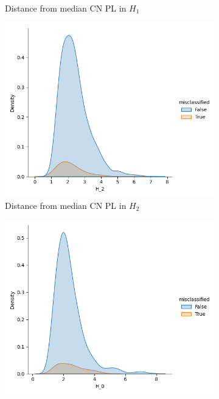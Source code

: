 \documentclass{article}
\begin{document}
\begin{figure}
\begin{subfigure}{0.32\textwidth}
    \caption{Distance from median CN PL in $H_1$}
  \end{subfigure}
  \begin{subfigure}{0.32\textwidth}
    \includegraphics[width=\textwidth]{figures/misclassification_distance/distribution_distance_misclassified_CN_H_2.png}
    \caption{Distance from median CN PL in $H_2$}
  \end{subfigure}
  \begin{subfigure}{0.32\textwidth}
    \includegraphics[width=\textwidth]{figures/misclassification_distance/distribution_distance_misclassified_AD_H_0.png}

\end{subfigure}
\end{figure}
\end{document}
